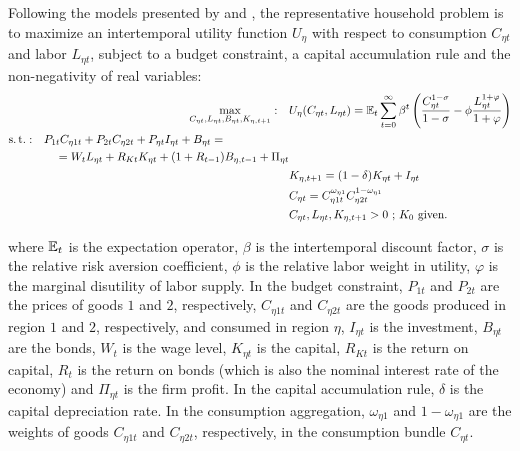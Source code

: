 \documentclass[../thesis.tex]{subfiles}
\begin{document}
Following the models presented by \textcite{costa_junior_understanding_2016} and \textcite{solis-garcia_ucb_2022}, the representative household problem is to maximize an intertemporal utility function $U_{\eta}$ with respect to consumption $C_{\eta t}$ and labor $L_{\eta t}$, subject to a budget constraint, a capital accumulation rule and the non-negativity of real variables:
\begin{align}
	\max_{C_{\eta t}, L_{\eta t}, B_{\eta t}, K_{\eta, t+1}}: \quad & U_{\eta}(C_{\eta t},L_{\eta t}) = {\mathbb{E}_{t}} \sum_{t=0}^{\infty} \beta^t \left(\frac{C_{\eta t}^{1-\sigma}}{1-\sigma} - \phi \frac{L_{\eta t}^{1+\varphi}}{1+\varphi} \right) \label{eq:reg-utility-function-0} 
	\\
	\begin{split}
		\operatorname{s.t.}: \quad & P_{1 t} C_{\eta 1 t} + P_{2 t} C_{\eta 2 t} + P_{\eta t} I_{\eta t} + B_{\eta t} = \\ & \quad = W_t L_{\eta t} + R_{Kt} K_{\eta t} + (1 + R_{t-1}) B_{\eta,t-1} + \Pi_{\eta t}
	\end{split} \label{eq:reg-budget-constraint} \\
	\quad & K_{\eta, t+1} = (1-\delta)K_{\eta t} + I_{\eta t} \label{eq:reg-law-of-motion-for-capital} \\
	\quad & C_{\eta t} = C_{\eta 1 t}^{\omega_{\eta 1}} C_{\eta 2 t}^{1-\omega_{\eta 1}} \label{eq:reg-consumption-aggregation} \\
	\quad & C_{\eta t}, L_{\eta t}, K_{\eta, t+1} > 0 \text{ ; $K_0$ given.} \nonumber
\end{align}

where ${\mathbb{E}_{t}}$ is the expectation operator, $\beta$ is the intertemporal discount factor, $\sigma$ is the relative risk aversion coefficient, $\phi$ is the relative labor weight in utility, $\varphi$ is the marginal disutility of labor supply. In the budget constraint, $P_{1t}$ and $P_{2t}$ are the prices of goods $1$ and $2$, respectively, $C_{\eta 1 t}$ and $C_{\eta 2 t}$ are the goods produced in region $1$ and $2$, respectively, and consumed in region $\eta$, $I_{\eta t}$ is the investment, $B_{\eta t}$ are the bonds, $W_t$ is the wage level, $K_{\eta t}$ is the capital, $R_{Kt}$ is the return on capital, $R_t$ is the return on bonds (which is also the nominal interest rate of the economy) and $\Pi_{\eta t}$ is the firm profit. In the capital accumulation rule, $\delta$ is the capital depreciation rate. In the consumption aggregation, ${\omega_{\eta 1}}$ and ${1 - \omega_{\eta 1}}$ are the weights of goods $C_{\eta 1 t}$ and $C_{\eta 2 t}$, respectively, in the consumption bundle $C_{\eta t}$.
\end{document}
